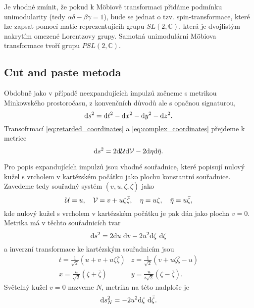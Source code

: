 Je vhodné zmínit, že pokud k Möbiově transformaci přidáme podmínku unimodularity (tedy $\alpha \delta - \beta \gamma = 1$),
bude se jednat o tzv. spin-transformace, které lze zapsat pomocí matic reprezentujícíh grupu $SL(2,\mathbb{C})$, která je dvojlistým nakrytím
omezené Lorentzovy grupy. Samotná unimodulární Möbiova transformace tvoří grupu $PSL(2, \mathbb{C})$.

\subsection{Cut and paste metoda}
Obdobně jako v případě neexpandujících impulzů začneme s metrikou Minkowského prostoročasu, z konvenčních důvodů ale s opačnou signaturou,
\begin{equation}
    \mathrm{d} s^2 = \mathrm{d} t^2 - \mathrm{d} x^2 - \mathrm{d} y^2 - \mathrm{d} z^2.
\end{equation}
Transofrmací \eqref{eq:retarded_coordinates} a \eqref{eq:complex_coordinates} přejdeme
k metrice
\begin{equation}
    \mathrm{d} s^2 = 2 \mathrm{d} \mathcal{U} \mathrm{d} \mathcal{V} - 2 \mathrm{d} \eta \mathrm{d} \bar{\eta}.
\end{equation}

Pro popis expandujících impulzů jsou vhodné souřadnice, které popisují nulový kužel s
vrcholem v kartézském počátku jako plochu konstantní souřadnice. Zavedeme tedy
souřadný systém $(v, u, \zeta, \bar{\zeta})$ jako
\begin{equation}
    \label{eq:expanding_null_tetrad}
    \mathcal{U} = u,~~~ \mathcal{V} = v + u \zeta \bar{\zeta}, ~~~ \eta = u \zeta, ~~~ \bar{\eta} = u \bar{\zeta},
\end{equation}
kde nulový kužel s vrcholem v kartézském počátku je pak dán jako plocha $v=0$. Metrika má v těchto souřadnicích tvar
\begin{equation}
    \label{eq:metric_stereographic_null}
    \mathrm{d} s^2 = 2 \mathrm{d} u ~ \mathrm{d} v - 2 u^2 \mathrm{d} \zeta ~ \mathrm{d} \bar{\zeta}
\end{equation}
a inverzní transformace ke kartézským souřadnicím jsou
\begin{align}
    t = \frac{1}{\sqrt{2}} \left(u + v + u \zeta \bar{\zeta}\right) & z = \frac{1}{\sqrt{2}} \left(v + u \zeta \bar{\zeta} - u\right) \\
    x = \frac{u}{\sqrt{2}} (\zeta + \bar{\zeta}) & y = \frac{u}{i \sqrt{2}} (\zeta - \bar{\zeta}).
\end{align}
Světelný kužel $v=0$ nazveme $N$, metrika na této nadploše je
\begin{equation}
    \label{eq:null_cone_metric}
    \mathrm{d} s_N^2 = -2 u^2 \mathrm{d} \zeta ~ \mathrm{d} \bar{\zeta}.
\end{equation}

